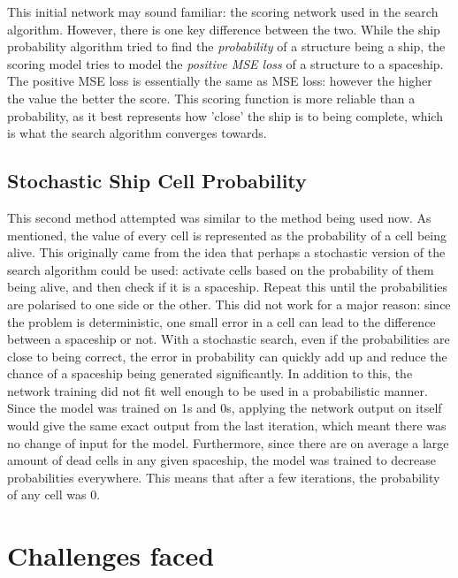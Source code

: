 \documentclass{l4proj}
\begin{document}
This initial network may sound familiar: the scoring network used in the search algorithm. However, there is one key difference between the two. While the ship probability algorithm tried to find the \emph{probability} of a structure being a ship, the scoring model tries to model the \emph{positive MSE loss} of a structure to a spaceship. The positive MSE loss is essentially the same as MSE loss: however the higher the value the better the score. This scoring function is more reliable than a probability, as it best represents how 'close' the ship is to being complete, which is what the search algorithm converges towards.

\subsection {Stochastic Ship Cell Probability}

This second method attempted was similar to the method being used now. As mentioned, the value of every cell is represented as the probability of a cell being alive. This originally came from the idea that perhaps a stochastic version of the search algorithm could be used: activate cells based on the probability of them being alive, and then check if it is a spaceship. Repeat this until the probabilities are polarised to one side or the other. This did not work for a major reason: since the problem is deterministic, one small error in a cell can lead to the difference between a spaceship or not. With a stochastic search, even if the probabilities are close to being correct, the error in probability can quickly add up and reduce the chance of a spaceship being generated significantly. In addition to this, the network training did not fit well enough to be used in a probabilistic manner. Since the model was trained on 1s and 0s, applying the network output on itself would give the same exact output from the last iteration, which meant there was no change of input for the model. Furthermore, since there are on average a large amount of dead cells in any given spaceship, the model was trained to decrease probabilities everywhere. This means that after a few iterations, the probability of any cell was 0.

\section{Challenges faced}
\end{document}
